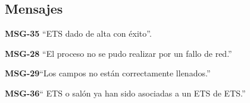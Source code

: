 \subsection{Mensajes}

\begin{Citemize}
    \item {\bf MSG-35} ``ETS  dado de alta con éxito''.
    \item {\bf MSG-28}  ``El proceso no se pudo realizar por un fallo de red.''
    \item {\bf MSG-29}{``Los campos no están correctamente llenados.''}
    \item {\bf MSG-36}{`` ETS o salón  ya han sido asociadas a un ETS de ETS.''}
    
\end{Citemize}

